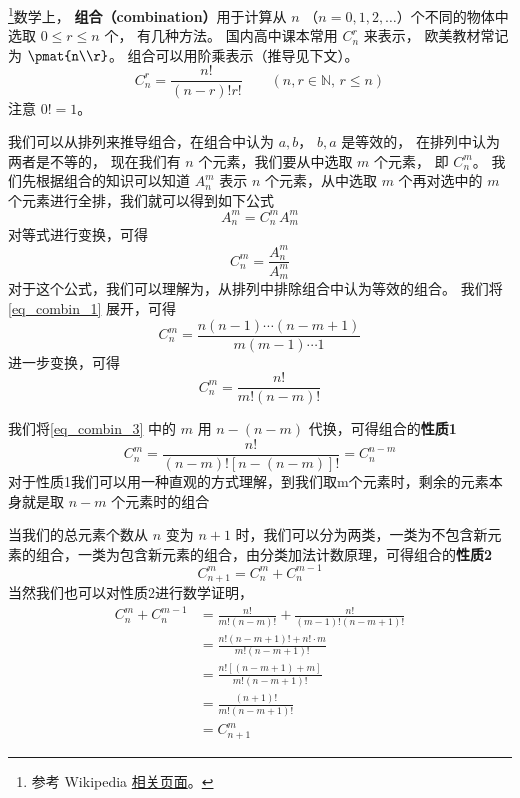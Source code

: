 
\begin{issues}
\issueDraft
\end{issues}


\footnote{参考 Wikipedia \href{https://en.wikipedia.org/wiki/Combination}{相关页面}。}数学上， \textbf{组合（combination）}用于计算从 $n$ （$n = 0, 1, 2, \dots$）个不同的物体中选取 $0 \leqslant r \leqslant n$ 个， 有几种方法。 国内高中课本常用 $C_n^r$ 来表示， 欧美教材常记为 $\pmat{n\\r}$。 组合可以用阶乘表示（推导见下文）。
\begin{equation}
C_n^r = \frac{n!}{(n-r)!r!} \qquad (n, r \in \mathbb N,\, r \leqslant n)
\end{equation}
注意 $0! = 1$。

我们可以从排列来推导组合，在组合中认为 ${a,b}$， ${b,a}$ 是等效的， 在排列中认为两者是不等的， 现在我们有 $n$ 个元素，我们要从中选取 $m$ 个元素， 即 $C_n^m$。
我们先根据组合的知识可以知道 $A_n^m$ 表示 $n$ 个元素，从中选取 $m$ 个再对选中的 $m$ 个元素进行全排，我们就可以得到如下公式
\begin{equation}
A_n^m = C_n^m A_m^m
\end{equation}
对等式进行变换，可得
\begin{equation}\label{eq_combin_1}
C_n^m = \frac{A_n^m}{A_m^m}
\end{equation}
对于这个公式，我们可以理解为，从排列中排除组合中认为等效的组合。
我们将\autoref{eq_combin_1} 展开，可得
\begin{equation}\label{eq_combin_2}
C_n^m = \frac{n(n - 1) \cdots (n - m + 1)}{m(m-1)\cdots 1}
\end{equation}
进一步变换，可得
\begin{equation}\label{eq_combin_3}
C_n^m = \frac{n!}{m!(n-m)!}
\end{equation}

我们将\autoref{eq_combin_3} 中的 $m$ 用 $n-(n-m)$ 代换，可得组合的\textbf{性质1}
\begin{equation}\label{eq_combin_4}
C_n^m = \frac{n!}{(n-m)![n-(n-m)]!} = C_n^{n-m}
\end{equation}
对于性质1我们可以用一种直观的方式理解，到我们取m个元素时，剩余的元素本身就是取 $n-m$ 个元素时的组合

当我们的总元素个数从 $n$ 变为 $n+1$ 时，我们可以分为两类，一类为不包含新元素的组合，一类为包含新元素的组合，由分类加法计数原理，可得组合的\textbf{性质2}
\begin{equation}
C_{n + 1}^m = C_n^m + C_n^{m - 1}
\end{equation}
当然我们也可以对性质2进行数学证明，
\begin{equation}
\begin{aligned}
C_n^m + C_n^{m - 1} &= \frac{n!}{m!(n-m)!} + \frac{n!}{(m - 1)!(n - m + 1)!}\\
&=\frac{n!(n - m + 1)! + n!\cdot m}{m!(n - m + 1)!}\\
&=\frac{n![(n - m + 1) + m]}{m!(n - m + 1)!}\\
&=\frac{(n + 1)!}{m!(n - m + 1)!}\\
&=C_{n+1}^m
\end{aligned}
\end{equation}